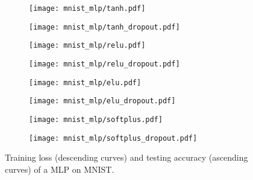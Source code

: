 \documentclass{article}
\newlength{\myfigwidth}
\begin{document}
\begin{figure*}%
\centering
\begin{subfigure}[b]{\myfigwidth}
\texttt{[image: mnist\_mlp/tanh.pdf]}
\end{subfigure}
\begin{subfigure}[b]{\myfigwidth}
\texttt{[image: mnist\_mlp/tanh\_dropout.pdf]}
\end{subfigure}
\begin{subfigure}[b]{\myfigwidth}
\texttt{[image: mnist\_mlp/relu.pdf]}
\end{subfigure}
\begin{subfigure}[b]{\myfigwidth}
\texttt{[image: mnist\_mlp/relu\_dropout.pdf]}
\end{subfigure}
\begin{subfigure}[b]{\myfigwidth}
\texttt{[image: mnist\_mlp/elu.pdf]}
\end{subfigure}
\begin{subfigure}[b]{\myfigwidth}
\texttt{[image: mnist\_mlp/elu\_dropout.pdf]}
\end{subfigure}
\begin{subfigure}[b]{\myfigwidth}
\texttt{[image: mnist\_mlp/softplus.pdf]}
\end{subfigure}
\begin{subfigure}[b]{\myfigwidth}
\texttt{[image: mnist\_mlp/softplus\_dropout.pdf]}
\end{subfigure}
\caption{Training loss (descending curves) and testing accuracy (ascending curves) of a MLP on MNIST.}\label{fig:mnistmlp}
\end{figure*}
\end{document}
